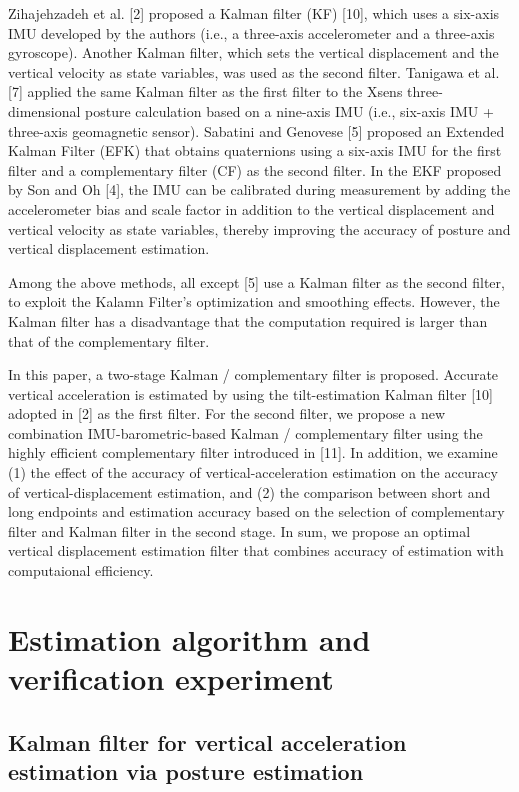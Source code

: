 \documentclass[10pt,journal,compsoc]{IEEEtran}
\begin{document}
Zihajehzadeh et al. [2] proposed a Kalman filter (KF) [10], which uses a six-axis
IMU developed by the authors (i.e., a three-axis accelerometer and a three-axis
gyroscope). Another Kalman filter, which sets the vertical displacement and
the vertical velocity as state variables, was used as the second filter.
Tanigawa et al. [7] applied the same Kalman filter as the first filter to the
Xsens three-dimensional posture calculation based on a nine-axis IMU (i.e., six-axis
IMU + three-axis geomagnetic sensor). Sabatini and Genovese [5]
proposed an Extended Kalman Filter (EFK) that obtains quaternions
using a six-axis IMU for the first filter and a complementary filter (CF) as the second
filter. In the EKF proposed by Son and Oh [4], the IMU can be calibrated during
measurement by adding the accelerometer bias and scale factor in addition
to the vertical displacement and vertical velocity as state variables, thereby
improving the accuracy of posture and vertical displacement estimation.

Among the above methods, all except [5] use a Kalman filter as the second filter,
to exploit the Kalamn Filter's optimization and smoothing effects.  However,
the Kalman filter has a disadvantage that the computation required is larger than
that of the complementary filter.

In this paper, a two-stage Kalman / complementary filter is proposed.  Accurate
vertical acceleration is estimated by using the tilt-estimation Kalman filter
[10] adopted in [2] as the first filter. For the second filter, we propose a new
combination IMU-barometric-based Kalman / complementary filter using the
highly efficient complementary filter introduced in [11].  In addition, we
examine (1) the effect of the accuracy of vertical-acceleration estimation on
the accuracy of vertical-displacement estimation, and (2) the comparison
between short and long endpoints and estimation accuracy based on the selection of
complementary filter and Kalman filter in the second stage. In sum,
we propose an optimal vertical displacement estimation filter that combines 
accuracy of estimation with computaional efficiency.

\section{Estimation algorithm and verification experiment}

\subsection{Kalman filter for vertical acceleration estimation via posture estimation}
\end{document}
